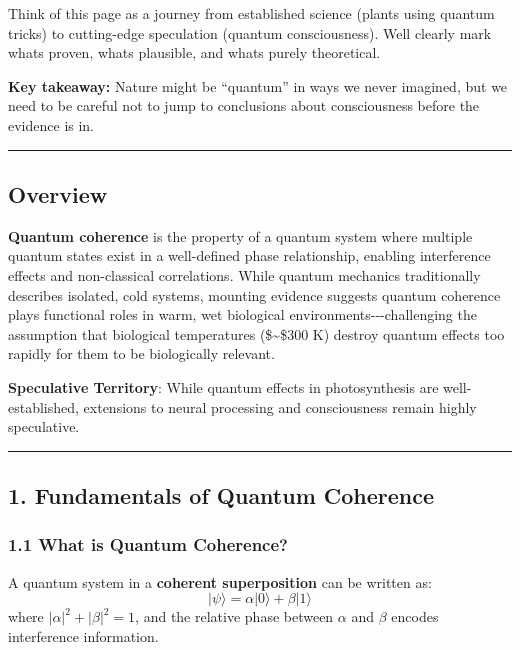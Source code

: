 Think of this page as a journey from established science (plants using
quantum tricks) to cutting-edge speculation (quantum consciousness).
We\textquotesingle ll clearly mark what\textquotesingle s proven,
what\textquotesingle s plausible, and what\textquotesingle s purely
theoretical.

\textbf{Key takeaway:} Nature might be ``quantum'' in ways we never
imagined, but we need to be careful not to jump to conclusions about
consciousness before the evidence is in.

\begin{center}\rule{0.5\linewidth}{0.5pt}\end{center}

\subsection{Overview}\label{overview}

\textbf{Quantum coherence} is the property of a quantum system where
multiple quantum states exist in a well-defined phase relationship,
enabling interference effects and non-classical correlations. While
quantum mechanics traditionally describes isolated, cold systems,
mounting evidence suggests quantum coherence plays functional roles in
warm, wet biological environments-\/-\/-challenging the assumption that
biological temperatures (\$\sim\$300 K) destroy quantum effects too
rapidly for them to be biologically relevant.

\textbf{Speculative Territory}: While quantum effects in photosynthesis
are well-established, extensions to neural processing and consciousness
remain highly speculative.

\begin{center}\rule{0.5\linewidth}{0.5pt}\end{center}

\subsection{1. Fundamentals of Quantum
Coherence}\label{fundamentals-of-quantum-coherence}

\subsubsection{1.1 What is Quantum
Coherence?}\label{what-is-quantum-coherence}

A quantum system in a \textbf{coherent superposition} can be written as:
\[|\psi\rangle = \alpha|0\rangle + \beta|1\rangle\] where
\(|\alpha|^2 + |\beta|^2 = 1\), and the relative phase between
\(\alpha\) and \(\beta\) encodes interference information.

